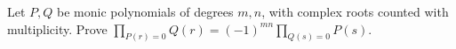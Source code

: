 Let $P,Q$ be monic polynomials of degrees $m,n$, with complex roots counted with multiplicity. Prove $\displaystyle\prod_{P(r)=0}Q(r)=(-1)^{mn}\prod_{Q(s)=0}P(s)$.
